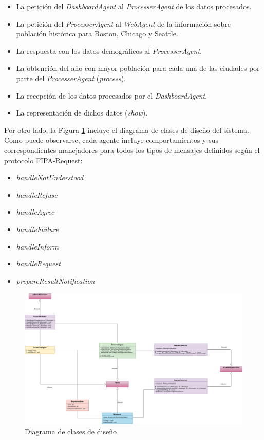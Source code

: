 \documentclass{estilo}
\begin{document}
    \begin{itemize}
        \item La petición del \textit{DashboardAgent} al \textit{ProcesserAgent} de los datos procesados.
        \item La petición del \textit{ProcesserAgent} al \textit{WebAgent} de la información sobre población histórica para Boston, Chicago y Seattle.
        \item La respuesta con los datos demográficos al \textit{ProcesserAgent}.
        \item La obtención del año con mayor población para cada una de las ciudades por parte del \textit{ProcesserAgent} (\textit{process}).
        \item La recepción de los datos procesados por el \textit{DashboardAgent}.
        \item La representación de dichos datos (\textit{show}).
    \end{itemize}
    
    Por otro lado, la Figura \ref{fig:fig4} incluye el diagrama de clases de diseño del sistema. Como puede observarse, cada agente incluye comportamientos y sus correspondientes manejadores para todos los tipos de mensajes definidos según el protocolo FIPA-Request:
    
    \begin{itemize}
        \item \textit{handleNotUnderstood}
        \item \textit{handleRefuse}
        \item \textit{handleAgree}
        \item \textit{handleFailure}
        \item \textit{handleInform}
        \item \textit{handleRequest}
        \item \textit{prepareResultNotification}
    \end{itemize}
    
    \begin{figure}[ht]
        \centering
        \includegraphics[scale=0.2]{images/diagrama-clases.png} 
        \caption{Diagrama de clases de diseño}
        \label{fig:fig4}
    \end{figure}
    
\end{document}
